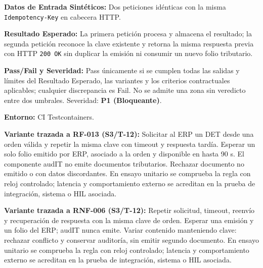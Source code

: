\par\noindent\textbf{Datos de Entrada Sintéticos:} Dos peticiones idénticas con la misma \texttt{I\allowbreak{}d\allowbreak{}e\allowbreak{}m\allowbreak{}p\allowbreak{}o\allowbreak{}t\allowbreak{}e\allowbreak{}n\allowbreak{}c\allowbreak{}y\allowbreak{}-\allowbreak{}K\allowbreak{}e\allowbreak{}y\allowbreak{}} en cabecera HTTP.\par
\par\noindent\textbf{Resultado Esperado:} La primera petición procesa y almacena el resultado; la segunda petición reconoce la clave existente y retorna la misma respuesta previa con HTTP \texttt{2\allowbreak{}0\allowbreak{}0\allowbreak{} O\allowbreak{}K\allowbreak{}} sin duplicar la emisión ni consumir un nuevo folio tributario.\par
\par\noindent\textbf{Pass/Fail y Severidad:} Pass únicamente si se cumplen todas las salidas y límites del Resultado Esperado, las variantes y los criterios contractuales aplicables; cualquier discrepancia es Fail. No se admite una zona sin veredicto entre dos umbrales. Severidad: \textbf{P1 (Bloqueante)}.\par
\par\noindent\textbf{Entorno:} CI Testcontainers.\par







\par\noindent\textbf{Variante trazada a RF-013 (S3/T-12):} Solicitar al ERP un DET desde una orden válida y repetir la misma clave con timeout y respuesta tardía. Esperar un solo folio emitido por ERP, asociado a la orden y disponible en hasta 90 s. El componente audIT no emite documentos tributarios. Rechazar documento no emitido o con datos discordantes. En ensayo unitario se comprueba la regla con reloj controlado; latencia y comportamiento externo se acreditan en la prueba de integración, sistema o HIL asociada.\par

\par\noindent\textbf{Variante trazada a RNF-006 (S3/T-12):} Repetir solicitud, timeout, reenvío y recuperación de respuesta con la misma clave de orden. Esperar una emisión y un folio del ERP; audIT nunca emite. Variar contenido manteniendo clave: rechazar conflicto y conservar auditoría, sin emitir segundo documento. En ensayo unitario se comprueba la regla con reloj controlado; latencia y comportamiento externo se acreditan en la prueba de integración, sistema o HIL asociada.\par
